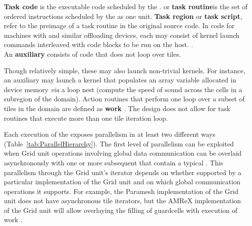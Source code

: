 \documentclass{article}
\begin{document}
\textbf{Task code} is the executable code scheduled by the \OR.
\textbf{\actionroutine} or \textbf{task routine}is the set of ordered instructions
scheduled by the \OR as one unit.  \textbf{Task
region} or \textbf{task script}, refer to
the preimage of a task routine in the original source code.  In
code for machines with \GPGPUs and similar offloading devices, each \taskroutine
may consist of kernel launch commands interleaved with code blocks to be run on
the host.  .\\

An \textbf{auxiliary
\taskroutines} consists of code that does
not loop over tiles.

  Though relatively simple, these \taskroutines may also launch
non-trivial kernels.  For instance, an auxiliary \taskroutine may launch a kernel that
populates  an array variable allocated in device memory \textit{via} a loop nest
(\eg compute the speed of sound across the cells in a subregion of the
domain).  Action routines that perform one loop over a subset of tiles in the domain are
defined as \textbf{work \taskroutines}.  The \OR design does not
allow for task routines that execute more than one tile iteration loop.


Each execution of the \OR exposes
parallelism in at least two different ways (Table~\ref{tab:ParallelHierarchy}).
The first level of parallelism can be exploited when Grid unit
operations involving global data communication can be overlaid asynchronously
with one or more subsequent \OLARs that contain a typical \ULKR.  This
parallelism through the Grid unit's iterator depends on
whether supported by a particular implementation of the Grid unit and on which
global communication operations it supports.  For example, the Paramesh
implementation of the Grid unit does not have asynchronous tile iterators, but
the AMReX implementation of the Grid unit will allow overlaying the filling of
guardcells with execution of work \taskroutines.\\
\end{document}
